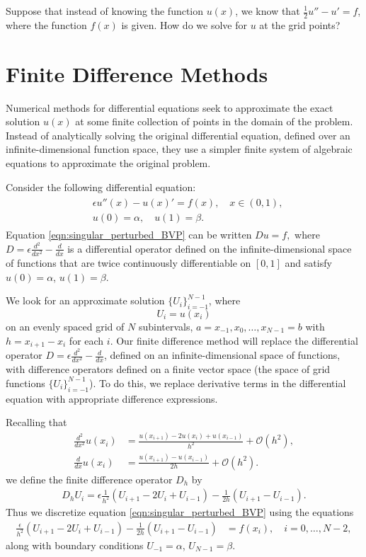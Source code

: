 Suppose that instead of knowing the function $u(x)$, we know that $\frac{1}{2}u'' - u' = f$, where the function $f(x)$ is given.
How do we solve for $u$ at the grid points?

\section*{Finite Difference Methods}

Numerical methods for differential equations seek to approximate the exact solution $u(x)$ at some finite collection of points in the domain of the problem.
Instead of analytically solving the original differential equation, defined over an infinite-dimensional function space, they use a simpler finite system of algebraic equations to approximate the original problem.

Consider the following differential equation:
\begin{align}
	\begin{split}
	&{ } \epsilon u''(x)-u(x)'= f(x), \quad x \in (0,1), \\
	&{ } u(0) = \alpha, \quad u(1) = \beta.
	\end{split} \label{eqn:singular_perturbed_BVP}
\end{align}
Equation \eqref{eqn:singular_perturbed_BVP} can be written $D u = f,$ where $D = \epsilon \frac{d^2}{dx^2} - \frac{d}{dx}$ is a differential operator defined on the infinite-dimensional space of functions that are twice continuously differentiable on $[0,1]$ and satisfy $u(0) = \alpha$, $u(1) = \beta$.

We look for an approximate solution $\{U_i\}_{i=-1}^{N-1}$, where \[U_i=u(x_i)\] on an evenly spaced grid of $N$ subintervals, $a = x_{-1}, x_0, \ldots, x_{N-1} = b$ with $h = x_{i+1}-x_i$ for each $i$.
Our finite difference method will replace the differential operator $D = \epsilon \frac{d^2}{dx^2} - \frac{d}{dx}$, defined on an infinite-dimensional space of functions, with difference operators defined on a finite vector space (the space of grid functions $\{U_i\}_{i=-1}^{N-1}$).
To do this, we replace derivative terms in the differential equation with appropriate difference expressions.

Recalling that
\begin{align*}
\frac{d^2}{dx^2} u(x_i) &= \frac{u(x_{i+1})- 2u(x_i) + u(x_{i-1})}{h^2} + \mathcal{O}(h^2),\\
\frac{d}{dx} u(x_i) &= \frac{u(x_{i+1})-u(x_{i-1})}{2h} + \mathcal{O}(h^2).
\end{align*}
we define the finite difference operator $D_h$ by
\begin{align}
D_h U_i = \epsilon \frac{1}{h^2}\left(U_{i+1} -2U_i + U_{i-1}\right) - \frac{1}{2h} \left(U_{i+1}-U_{i-1} \right). \label{fd_operator}
\end{align}
Thus we discretize equation \eqref{eqn:singular_perturbed_BVP} using the equations
\begin{align*}
	\frac{\epsilon}{h^2} (U_{i+1}- 2U_i + U_{i-1}) - \frac{1}{2h} \left(U_{i+1}-U_{i-1} \right)  &= f(x_i), \quad i = 0, \ldots, N-2,
\end{align*}
along with boundary conditions $U_{-1} = \alpha$, $U_{N-1} = \beta$.

